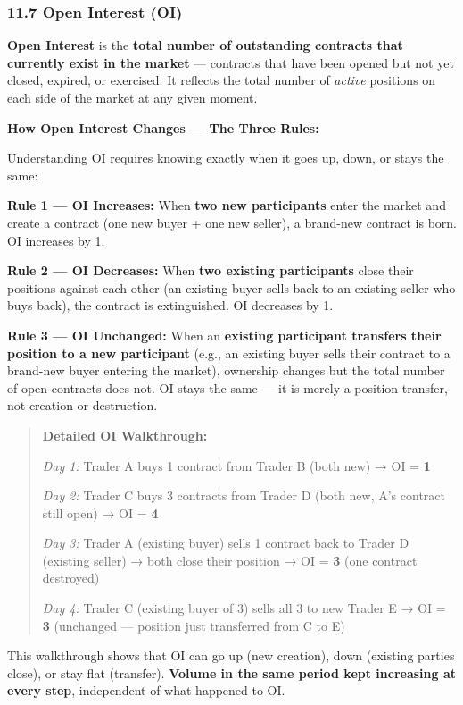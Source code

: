 \documentclass[12pt,openany]{book}
\begin{document}
\subsubsection{11.7 Open Interest (OI)}

\textbf{Open Interest} is the \textbf{total number of outstanding contracts that currently exist in the market} — contracts that have been opened but not yet closed, expired, or exercised. It reflects the total number of \emph{active} positions on each side of the market at any given moment.

\textbf{How Open Interest Changes — The Three Rules:}

Understanding OI requires knowing exactly when it goes up, down, or stays the same:

\textbf{Rule 1 — OI Increases:} When \textbf{two new participants} enter the market and create a contract (one new buyer + one new seller), a brand-new contract is born. OI increases by 1.

\textbf{Rule 2 — OI Decreases:} When \textbf{two existing participants} close their positions against each other (an existing buyer sells back to an existing seller who buys back), the contract is extinguished. OI decreases by 1.

\textbf{Rule 3 — OI Unchanged:} When an \textbf{existing participant transfers their position to a new participant} (e.g., an existing buyer sells their contract to a brand-new buyer entering the market), ownership changes but the total number of open contracts does not. OI stays the same — it is merely a position transfer, not creation or destruction.

\begin{quote}
\textbf{Detailed OI Walkthrough:}

\emph{Day 1:} Trader A buys 1 contract from Trader B (both new) → OI = \textbf{1}

\emph{Day 2:} Trader C buys 3 contracts from Trader D (both new, A's contract still open) → OI = \textbf{4}

\emph{Day 3:} Trader A (existing buyer) sells 1 contract back to Trader D (existing seller) → both close their position → OI = \textbf{3} (one contract destroyed)

\emph{Day 4:} Trader C (existing buyer of 3) sells all 3 to new Trader E → OI = \textbf{3} (unchanged — position just transferred from C to E)
\end{quote}

This walkthrough shows that OI can go up (new creation), down (existing parties close), or stay flat (transfer). \textbf{Volume in the same period kept increasing at every step}, independent of what happened to OI.
\end{document}
